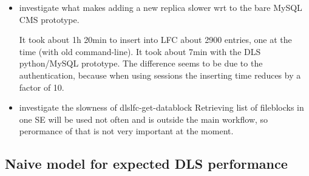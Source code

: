 \documentclass[pdftex]{cmspaper}
\begin{document}
\begin{itemize}

 \item investigate what makes adding a new replica slower wrt to the bare MySQL CMS prototype. 
      
       It took about 1h 20min to insert into LFC about 2900 entries, one at the time (with old command-line).
       It took about 7min with the DLS python/MySQL prototype.
       The difference seems to be due to the authentication, because when using sessions the 
       inserting time reduces by a factor of 10. 

 \item investigate the slowness of dlslfc-get-datablock 
       Retrieving list of fileblocks in one SE will be used not often and is outside the main workflow, so perormance of that is not very important at the moment.
       
                                                                                                  
  \end{itemize} 


\subsection{ Naive model for expected DLS performance}
\end{document}
